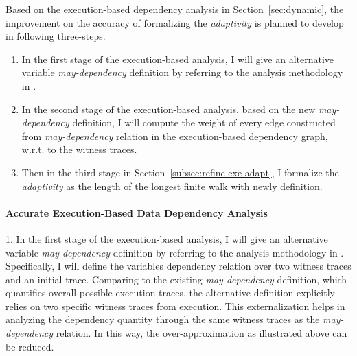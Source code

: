 Based on the execution-based dependency analysis in Section~\ref{sec:dynamic}, the improvement on the accuracy 
of formalizing the
\emph{adaptivity} is planned to develop in following three-steps.
\begin{enumerate}
\item In the first stage of the execution-based analysis, 
I will give an alternative variable \emph{may-dependency} definition 
by referring to the analysis methodology in \cite{Cousot19a}.
%
%
\item In the second stage of the execution-based analysis, 
based on the new \emph{may-dependency} definition,
I will compute the weight of every edge constructed from 
\emph{may-dependency} relation in the execution-based dependency graph, w.r.t. to the witness traces.
%
\item Then in the third stage in Section~\ref{subsec:refine-exe-adapt}, 
I formalize the \emph{adaptivity} as the 
length of the longest finite walk with newly definition. 
\end{enumerate}

\paragraph{Accurate Execution-Based Data Dependency Analysis}
\label{subsec:refine-exe-datadep}


1. In the first stage of the execution-based analysis, 
I will give an alternative variable \emph{may-dependency} definition 
by referring to the analysis methodology in \cite{Cousot19a}.
\\
Specifically, I will define the variables dependency relation over two witness traces and an initial trace. Comparing to 
the existing \emph{may-dependency} definition, which quantifies overall possible execution traces, the alternative
definition explicitly relies on two specific witness traces from execution.
This externalization helps in analyzing the dependency quantity through the same 
witness traces as the \emph{may-dependency} relation. In this way, the over-approximation as illustrated above
can be reduced.

